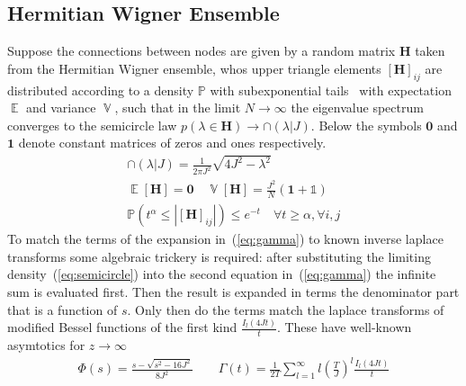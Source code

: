 \documentclass{article}[12pt]
\numberwithin{equation}{section}
\DeclareMathOperator*{\E}{\mathbb{E}}
\DeclareMathOperator*{\V}{\mathbb{V}}
\begin{document}
\subsection{Hermitian Wigner Ensemble}
Suppose the connections between nodes are given by a random matrix
$\mathbf{H}$ taken from the Hermitian Wigner ensemble, whos upper triangle elements
$[\mathbf{H}]_{ij}$ are distributed according to a density $\mathbb{P}$ with
subexponential tails~\cite{} with expectation $\E$ and variance
$\V$, such that in the limit $N\rightarrow\infty$ the eigenvalue
spectrum converges to the semicircle law $p(\lambda\in\mathbf{H})\rightarrow\cap(\lambda|J)$.
Below the symbols $\mathbf{0}$ and $\mathbf{1}$ denote constant matrices of zeros and ones
respectively.
\begin{align}
\cap(\lambda|J)=\frac{1}{2\pi J^2}\sqrt{4J^2-\lambda^2}\label{eq:semicircle}
\quad\quad\\
\E[\mathbf{H}]=\mathbf{0}
\quad
\V[\mathbf{H}]=\frac{J^2}{N}(\mathbf{1}+\mathbb{1})
\quad\\
\mathbb{P}\left(
t^\alpha\leq
\left|[\mathbf{H}]_{ij}\right|
\right)\leq e^{-t}
\quad
\forall t\geq\alpha,\forall i,j
\end{align}
To match the terms of the expansion in~(\ref{eq:gamma}) to known inverse laplace
transforms some algebraic trickery is required: after substituting the limiting
density~(\ref{eq:semicircle}) into the second equation in~(\ref{eq:gamma}) the
infinite sum is evaluated first. Then the result is expanded in terms the denominator
part that is a function of $s$. Only then do the terms match the laplace transforms
of modified Bessel functions of the first kind $\frac{I_{l}(4Jt)}{t}$.
These have well-known asymtotics for $z\rightarrow\infty$
\begin{align}
  \Phi(s)=\frac{s-\sqrt{s^2-16J^2}}{8J^2}\qquad
  \Gamma(t)=\frac{1}{2T}
  \sum_{l=1}^{\infty}l\left(\frac{T}{J}\right)^{l}\frac{I_{l}(4Jt)}{t}
\end{align}
\pagebreak
\end{document}
